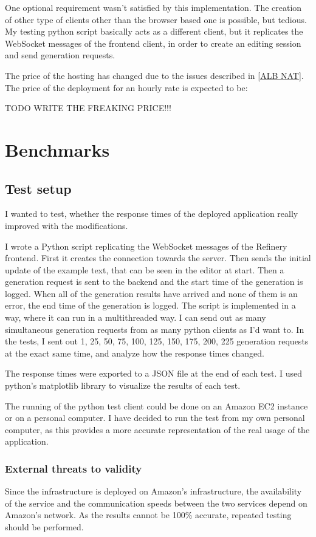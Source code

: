 	One optional requirement wasn't satisfied by this implementation. The creation of other type of clients other than the browser
	based one is possible, but tedious. My testing python script basically acts as a different client, but it replicates the WebSocket
	messages of the frontend client, in order to create an editing session and send generation requests.

	The price of the hosting has changed due to the issues described in \ref{ALB NAT}. The price of the deployment for an hourly rate 
	is expected to be:

	TODO WRITE THE FREAKING PRICE!!!

	\section{Benchmarks} \label{Benchmarks}
		\subsection{Test setup}
		I wanted to test, whether the response times of the deployed application really improved with the modifications.

		I wrote a Python script replicating the WebSocket messages of the Refinery frontend. First it creates the connection
		towards the server. Then sends the initial update
		of the example text, that can be seen in the editor at start. Then a generation request is sent to the backend and the start time of the generation
		is logged. When all of the generation results have arrived and none of them is an error, the end time of the generation is logged. 
		The script is implemented in a way, where it can run in a multithreaded way. I can send out as many simultaneous generation requests 
		from as many python clients as I'd want to. In the tests, I sent out 1, 25, 50, 75, 100, 125, 150, 175, 200, 225 generation requests
		at the exact same time, and analyze how the response times changed.

		The response times were exported to a JSON file at the end of each test. I used python's matplotlib library to visualize the results
		of each test.

		The running of the python test client could be done on an Amazon EC2 instance or on a personal computer. I have decided to run the test 
		from my own personal computer, as this provides a more accurate representation of the real usage of the application.

		\subsubsection{External threats to validity}
			Since the infrastructure is deployed on Amazon's infrastructure, the availability of the service and the communication speeds between the two services 
			depend on Amazon's network. As the results cannot be 100\% accurate, repeated testing should be
			performed.

